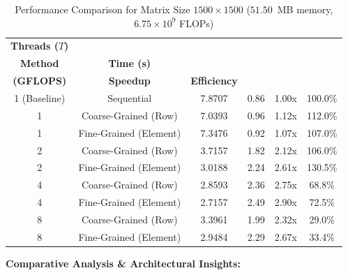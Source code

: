 \documentclass[12pt]{article}
\begin{document}
\begin{table}[H]
\centering
\caption{Performance Comparison for Matrix Size $1500 \times 1500$ ($51.50$~MB memory, $6.75 \times 10^9$ FLOPs)}
\vspace{0.15cm}
\begin{tabular}{cccccc}
\toprule
\textbf{Threads ($T$)} & \shortstack{\textbf{Decomposition}\\\textbf{Method}} & \textbf{Time (s)} & \shortstack{\textbf{Throughput}\\\textbf{(GFLOPS)}} & \textbf{Speedup} & \textbf{Efficiency} \\
\midrule
1 (Baseline) & Sequential & 7.8707 & 0.86 & 1.00x & 100.0\% \\
\midrule
1 & Coarse-Grained (Row) & 7.0393 & 0.96 & 1.12x & 112.0\% \\
1 & Fine-Grained (Element) & 7.3476 & 0.92 & 1.07x & 107.0\% \\
\midrule
2 & Coarse-Grained (Row) & 3.7157 & 1.82 & 2.12x & 106.0\% \\
2 & Fine-Grained (Element) & 3.0188 & 2.24 & 2.61x & 130.5\% \\
\midrule
4 & Coarse-Grained (Row) & 2.8593 & 2.36 & 2.75x & 68.8\% \\
4 & Fine-Grained (Element) & 2.7157 & 2.49 & 2.90x & 72.5\% \\
\midrule
8 & Coarse-Grained (Row) & 3.3961 & 1.99 & 2.32x & 29.0\% \\
8 & Fine-Grained (Element) & 2.9484 & 2.29 & 2.67x & 33.4\% \\
\bottomrule
\end{tabular}
\end{table}

\vspace{0.3cm}
\textbf{Comparative Analysis \& Architectural Insights:}
\end{document}
